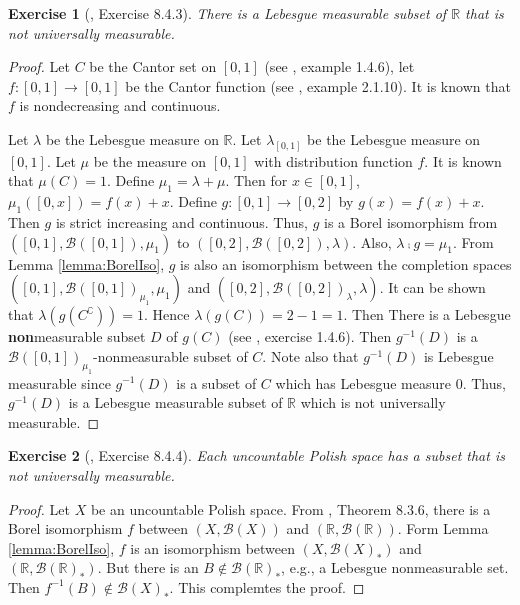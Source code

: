 \documentclass[11pt]{article}
\theoremstyle{plain}
\newtheorem{exercise}{Exercise}
\theoremstyle{definition}
\theoremstyle{remark}
\begin{document}
\begin{exercise}[\cite{book:992991}, Exercise 8.4.3]
    There is a Lebesgue measurable subset of $\mathbb R$ that is not universally measurable.
\end{exercise}
\begin{proof}
    Let $C$ be the Cantor set on $[0,1]$ (see  \cite{book:992991}, example 1.4.6), let $f:[0,1] \to [0,1]$ be the Cantor function (see \cite{book:992991}, example 2.1.10).
    It is known that $f$ is nondecreasing and continuous.

    Let $\lambda$ be the Lebesgue measure on $\mathbb R$.
    Let $\lambda_{[0,1]}$ be the Lebesgue measure on $[0,1]$.
    Let $\mu$ be the measure on $[0,1]$ with distribution function $f$.
    It is known that $\mu(C)=1$.
    Define $\mu_1=\lambda + \mu$.
    Then for $x\in [0,1]$, $\mu_1([0,x]) =f(x)+x$.
    Define $g:[0,1] \to [0,2]$ by $g(x)= f(x) + x$.
    Then $g$ is strict increasing and continuous.
    Thus, $g$ is a Borel isomorphism from $([0,1], \mathscr B ([0,1]), \mu_1)$ to $([0,2], \mathscr B([0,2]), \lambda)$.
    Also, $\lambda \comp g = \mu_1$.
    From Lemma \ref{lemma:BorelIso}, $g$ is also an isomorphism between the completion spaces $([0,1], \mathscr B ([0,1])_{\mu_1}, \mu_1)$ and $([0,2], \mathscr B([0,2])_{\lambda}, \lambda)$.
    It can be shown that $\lambda(g(C^\complement))= 1 $. 
    Hence $\lambda(g(C))=2-1=1$.
    Then There is a Lebesgue \textbf{non}measurable subset $D$ of $g(C)$ (see \cite{book:992991}, exercise 1.4.6).
    Then $g^{-1}(D)$ is a $\mathscr B ([0,1])_{\mu_1}$-nonmeasurable subset of $C$.
    Note also that $g^{-1}(D)$ is Lebesgue measurable since $g^{-1} (D)$ is a subset of $C$ which has Lebesgue measure $0$.
    Thus, $g^{-1}(D)$ is a Lebesgue measurable subset of $\mathbb R$ which is not universally measurable.

\end{proof}

\begin{exercise}[\cite{book:992991}, Exercise 8.4.4]
    Each uncountable Polish space has a subset that is not universally measurable.
\end{exercise}
\begin{proof}
    Let $X$ be an uncountable Polish space.
    From \cite{book:992991}, Theorem 8.3.6, there is a Borel isomorphism $f$ between $(X, \mathscr B (X))$ and $(\mathbb R, \mathscr B(\mathbb R))$.
    Form Lemma \ref{lemma:BorelIso}, $f$ is an isomorphism between $(X, \mathscr B(X)_*)$ and $(\mathbb R, \mathscr B(\mathbb R)_*)$.
    But there is an $B \notin \mathscr B(\mathbb R)_*$, e.g., a Lebesgue nonmeasurable set.
    Then $f^{-1}(B) \notin \mathscr B (X)_*$.
    This complemtes the proof.
\end{proof}
\end{document}
